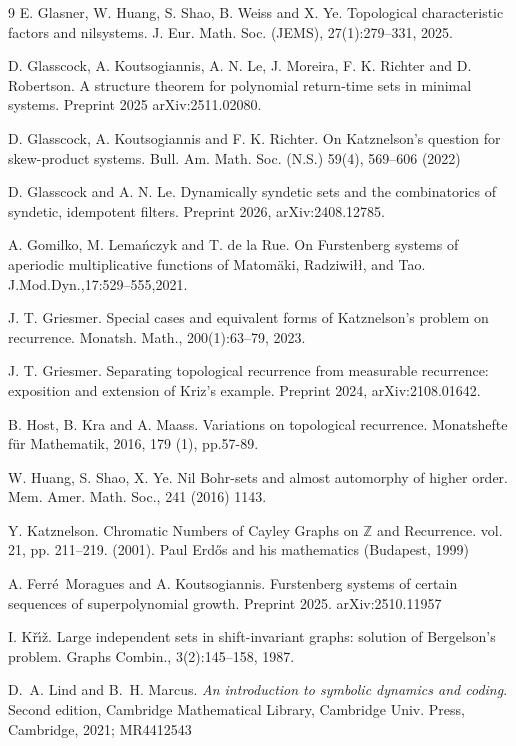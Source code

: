 \documentclass{amsart}
\numberwithin{equation}{section}
\theoremstyle{definition}
\theoremstyle{plain}
\newcommand{\Z}{{\mathbb Z}}
\begin{document}
\begin{thebibliography}{9}
 E. Glasner, W. Huang, S. Shao, B. Weiss and X. Ye. Topological characteristic factors and
nilsystems. J. Eur. Math. Soc. (JEMS), 27(1):279–331, 2025. 

 D. Glasscock, A. Koutsogiannis, A. N. Le, J. Moreira, F. K. Richter and D. Robertson. A structure theorem for polynomial return-time sets in minimal systems. Preprint 2025 arXiv:2511.02080.

 D. Glasscock, A. Koutsogiannis and F. K. Richter. On Katznelson’s question for skew-product systems. Bull. Am. Math. Soc. (N.S.) 59(4), 569–606 (2022)

D. Glasscock and A. N. Le. Dynamically syndetic sets and the combinatorics of syndetic, idempotent filters. 
Preprint 2026, arXiv:2408.12785.

A. Gomilko, M. Lemańczyk and T. de la Rue. On Furstenberg systems of aperiodic multiplicative
functions of Matomäki, Radziwiłł, and Tao. J.Mod.Dyn.,17:529–555,2021.

J. T. Griesmer. Special cases and equivalent forms of Katznelson’s problem on recurrence. Monatsh.
Math., 200(1):63–79, 2023.

J. T. Griesmer. Separating topological recurrence from measurable recurrence: exposition and extension of Kriz's example. Preprint 2024, arXiv:2108.01642.

B. Host, B. Kra and A. Maass. Variations on topological recurrence. Monatshefte für Mathematik, 2016, 179 (1), pp.57-89.

 W. Huang, S. Shao, X. Ye. 
Nil Bohr-sets and almost automorphy of higher order. Mem.
Amer. Math. Soc., 241 (2016) 1143.

 Y. Katznelson. Chromatic Numbers of Cayley Graphs on $\Z$ and Recurrence. vol. 21, pp. 211–219. (2001). Paul Erdős and his mathematics (Budapest, 1999)

 A. Ferr\'e~Moragues and A. Koutsogiannis. Furstenberg systems of certain sequences of superpolynomial growth. Preprint 2025. arXiv:2510.11957 

 I. K\v{r}\'{\i}\v{z}. Large independent sets in shift-invariant graphs: solution of Bergelson’s problem. Graphs
Combin., 3(2):145–158, 1987.

 D.~A. Lind and B.~H. Marcus. {\it An introduction to symbolic dynamics and coding}. Second edition, 
Cambridge Mathematical Library, Cambridge Univ. Press, Cambridge, 2021; MR4412543


\end{thebibliography}
\end{document}
